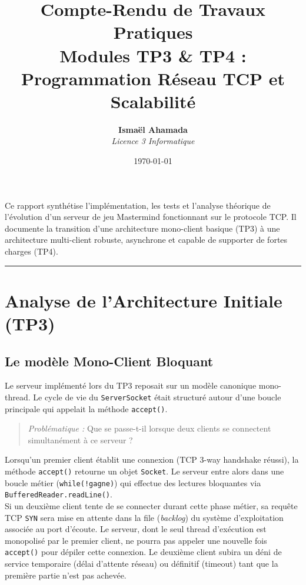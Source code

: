 \documentclass[11pt,a4paper]{article}
\title{\vspace{-2cm}\Huge\textbf{Compte-Rendu de Travaux Pratiques}\\ \Large Modules TP3 \& TP4 : Programmation Réseau TCP et Scalabilité}
\author{\textbf{Ismaël Ahamada} \\ \textit{Licence 3 Informatique}}
\date{\today}
\begin{document}
\maketitle
\thispagestyle{empty}

\begin{tcolorbox}[colback=blue!5!white,colframe=blue!75!black,title=Objectif du Document]
Ce rapport synthétise l'implémentation, les tests et l'analyse théorique de l'évolution d'un serveur de jeu Mastermind fonctionnant sur le protocole TCP. Il documente la transition d'une architecture mono-client basique (TP3) à une architecture multi-client robuste, asynchrone et capable de supporter de fortes charges (TP4).
\end{tcolorbox}

\tableofcontents
\vspace{1cm}
\hrule
\vspace{1cm}

\section{Analyse de l'Architecture Initiale (TP3)}

\subsection{Le modèle Mono-Client Bloquant}
Le serveur implémenté lors du TP3 reposait sur un modèle canonique mono-thread. Le cycle de vie du \texttt{ServerSocket} était structuré autour d'une boucle principale qui appelait la méthode \texttt{accept()}.

\begin{quote}
\textit{Problématique :} Que se passe-t-il lorsque deux clients se connectent simultanément à ce serveur ?
\end{quote}

Lorsqu'un premier client établit une connexion (TCP 3-way handshake réussi), la méthode \texttt{accept()} retourne un objet \texttt{Socket}. Le serveur entre alors dans une boucle métier (\texttt{while(!gagne)}) qui effectue des lectures bloquantes via \texttt{BufferedReader.readLine()}. \\
Si un deuxième client tente de se connecter durant cette phase métier, sa requête TCP \texttt{SYN} sera mise en attente dans la file (\textit{backlog}) du système d'exploitation associée au port d'écoute. Le serveur, dont le seul thread d'exécution est monopolisé par le premier client, ne pourra pas appeler une nouvelle fois \texttt{accept()} pour dépiler cette connexion. Le deuxième client subira un déni de service temporaire (délai d'attente réseau) ou définitif (timeout) tant que la première partie n'est pas achevée.
\end{document}
